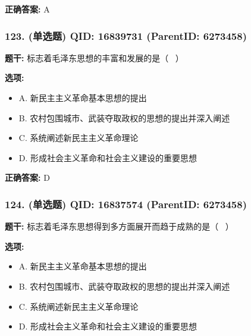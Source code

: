\documentclass[12pt,UTF8]{ctexart}
\begin{document}
\textbf{正确答案:}
A

\vspace{0.3em}\hrulefill\vspace{0.7em}

\subsubsection*{123. (单选题) \small QID: 16839731 (ParentID: 6273458)}

\textbf{题干:}
标志着毛泽东思想的丰富和发展的是（  ）



\textbf{选项:}
\begin{itemize}[leftmargin=*]

  \item A. 新民主主义革命基本思想的提出

  \item B. 农村包围城市、武装夺取政权的思想的提出并深入阐述

  \item C. 系统阐述新民主主义革命理论

  \item D. 形成社会主义革命和社会主义建设的重要思想

\end{itemize}

\textbf{正确答案:}
D

\vspace{0.3em}\hrulefill\vspace{0.7em}

\subsubsection*{124. (单选题) \small QID: 16837574 (ParentID: 6273458)}

\textbf{题干:}
标志着毛泽东思想得到多方面展开而趋于成熟的是（  ）



\textbf{选项:}
\begin{itemize}[leftmargin=*]

  \item A. 新民主主义革命基本思想的提出

  \item B. 农村包围城市、武装夺取政权的思想的提出并深入阐述

  \item C. 系统阐述新民主主义革命理论

  \item D. 形成社会主义革命和社会主义建设的重要思想

\end{itemize}
\end{document}
